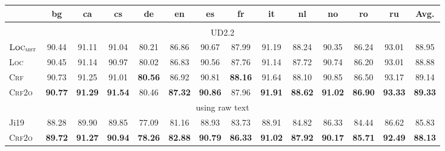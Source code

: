 \documentclass[11pt,a4paper]{article}
\begin{document}
\begin{table*}[tb]
\setlength{\tabcolsep}{3.4pt}
\centering
\begin{tabular}{lccccccccccccc}
\toprule
& bg & ca & cs & de & en & es & fr & it & nl & no & ro & ru & Avg.\\[1pt]
\hline
\\[-9pt]
\multicolumn{14}{c}{UD2.2} \\[1pt]
$\textsc{Loc}_{\textsc{mst}}$ &         90.44  &         91.11  &         91.04                   &         80.21                   &         86.86                   &         90.67                   &         87.99  &         91.19                    &         88.24                    &         90.35                   &         86.24                    &         93.01                    &         88.95 \\
\textsc{Loc}                  &         90.45  &         91.14  &         90.97                   &         80.02                   &         86.83                   &         90.56                   &         87.76  &         91.14                    &         87.72                    &         90.74                   &         86.20                    &         93.01                    &         88.88 \\
\textsc{Crf}                  &         90.73  &         91.25  &         91.01                   & \textbf{80.56}\rlap{$^\dagger$} &         86.92                   &         90.81\rlap{$^\dagger$}  & \textbf{88.16} &         91.64\rlap{$^\dagger$}   &         88.10                    &         90.85                   &         86.50                    &         93.17\rlap{$^\dagger$}   &         89.14\rlap{$^\ddagger$} \\
\textsc{Crf2o}                & \textbf{90.77} & \textbf{91.29} & \textbf{91.54}\rlap{$^\dagger$} &         80.46                   & \textbf{87.32}\rlap{$^\dagger$} & \textbf{90.86}\rlap{$^\dagger$} &         87.96  & \textbf{91.91}\rlap{$^\ddagger$} & \textbf{88.62}\rlap{$^\ddagger$} & \textbf{91.02}\rlap{$^\dagger$} & \textbf{86.90}\rlap{$^\ddagger$} & \textbf{93.33}\rlap{$^\ddagger$} & \textbf{89.33}\rlap{$^\ddagger$} \\[1pt]
\multicolumn{14}{c}{using raw text} \\[1pt]
Ji19           & 88.28 & 89.90 & 89.85 & 77.09 & 81.16 & 88.93 & 83.73 & 88.91 & 84.82 & 86.33 & 84.44 & 86.62 & 85.83 \\
\textsc{Crf2o} & \textbf{89.72} & \textbf{91.27} & \textbf{90.94}  & \textbf{78.26} & \textbf{82.88} & \textbf{90.79} & \textbf{86.33} & \textbf{91.02} & \textbf{87.92} & \textbf{90.17} & \textbf{85.71} & \textbf{92.49} & \textbf{88.13} \\

\end{tabular}
\end{table*}
\end{document}

